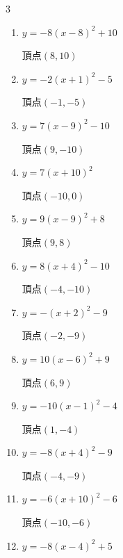 \begin{multicols}{3}
\begin{enumerate}
  \item $\displaystyle y=-8\left( x-8\right)^{2}+10$

        $\displaystyle 頂点\left( 8 , 10 \right)$

  \item $\displaystyle y=-2\left( x+1\right)^{2}-5$

        $\displaystyle 頂点\left( -1 , -5 \right)$

  \item $\displaystyle y=7\left( x-9\right)^{2}-10$

        $\displaystyle 頂点\left( 9 , -10 \right)$

  \item $\displaystyle y=7\left( x+10\right)^{2}$

        $\displaystyle 頂点\left( -10 , 0 \right)$

  \item $\displaystyle y=9\left( x-9\right)^{2}+8$

        $\displaystyle 頂点\left( 9 , 8 \right)$

  \item $\displaystyle y=8\left( x+4\right)^{2}-10$

        $\displaystyle 頂点\left( -4 , -10 \right)$

  \item $\displaystyle y=-\left( x+2\right)^{2}-9$

        $\displaystyle 頂点\left( -2 , -9 \right)$

  \item $\displaystyle y=10\left( x-6\right)^{2}+9$

        $\displaystyle 頂点\left( 6 , 9 \right)$

  \item $\displaystyle y=-10\left( x-1\right)^{2}-4$

        $\displaystyle 頂点\left( 1 , -4 \right)$

  \item $\displaystyle y=-8\left( x+4\right)^{2}-9$

        $\displaystyle 頂点\left( -4 , -9 \right)$

  \item $\displaystyle y=-6\left( x+10\right)^{2}-6$

        $\displaystyle 頂点\left( -10 , -6 \right)$

  \item $\displaystyle y=-8\left( x-4\right)^{2}+5$


\end{enumerate}
\end{multicols}
